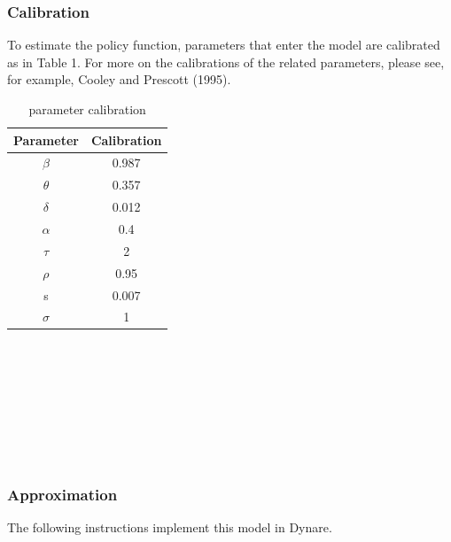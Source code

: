 \documentclass[a4paper,12pt]{scrartcl} %
\begin{document}
\subsubsection{Calibration}
To estimate the policy function, parameters that enter the model are calibrated as in Table 1. For more on the calibrations of the related parameters, please see, for example, Cooley and Prescott (1995).
\begin{table}[h]
\centering\caption{parameter calibration}\label{1}
\begin{tabular}{cc}
  \hline
  Parameter&Calibration\\
  \hline
  $\beta$&0.987\\
  $\theta$&0.357\\
  $\delta$&0.012\\
  $\alpha$&0.4\\
  $\tau$&2\\
  $\rho$&0.95\\
  s&0.007\\
  $\sigma$&1\\
  \hline
  \end{tabular}
\end{table}
\\
\\
\\
\\
\\
\\
\\

\subsubsection{Approximation}

The following instructions implement this model in Dynare.
\end{document}
